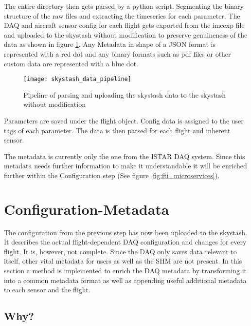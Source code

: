 The entire directory then gets parsed by a python script. Segmenting the binary structure of the raw files and extracting the timeseries for each parameter. The DAQ and aircraft sensor config for each flight gets exported from the imcexp file and uploaded to the skystash without modification to preserve genuineness of the data as shown in figure \ref{fig:skystash_data_pipeline}. Any Metadata in shape of a JSON format is represented with a red dot and any binary formats such as pdf files or other custom data are represented with a blue dot.

\begin{figure}
    \centering
    \texttt{[image: skystash\_data\_pipeline]}
    \caption{Pipeline of parsing and uploading the skystash data to the skystash without modification}
    \label{fig:skystash_data_pipeline}
\end{figure}

Parameters are saved under the flight object. Config data is assigned to the user tags of each parameter. The data is then parsed for each flight and inherent sensor.

The metadata is currently only the one from the ISTAR DAQ system. Since this metadata needs further information to make it understandable it will be enriched further within the Configuration step (See figure \ref{fig:fti_microservices}).

\newpage


\section{Configuration-Metadata}

The configuration from the previous step has now been uploaded to the skystash. It describes the actual flight-dependent DAQ configuration and changes for every flight. It is, however, not complete. Since the DAQ only saves data relevant to itself, other vital metadata for users as well as the SHM are not present. In this section a method is implemented to enrich the DAQ metadata by transforming it into a common metadata format as well as appending useful additional metadata to each sensor and the flight.


\subsection{Why?}

